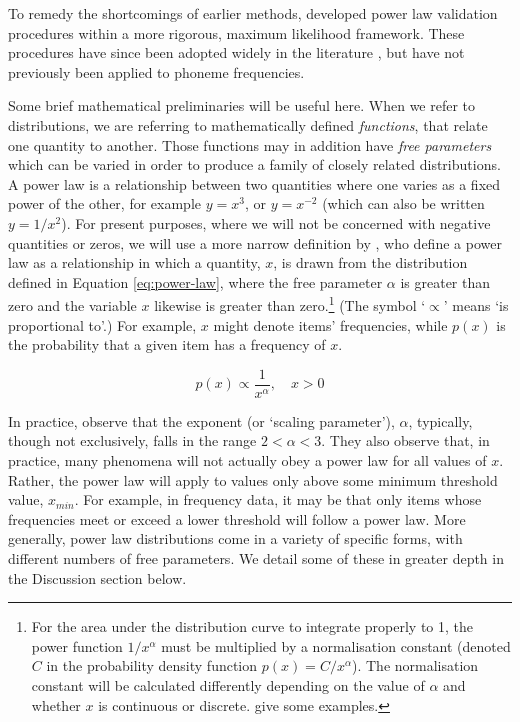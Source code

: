 To remedy the shortcomings of earlier methods, \textcite{clauset_power-law_2009} developed power law validation procedures within a more rigorous, maximum likelihood framework. These procedures have since been adopted widely in the literature \autocites[for example,][]{touboul_can_2010}{cho_friendship_2011}{brzezinski_power_2014}[and][]{lee_change_2018}, but have not previously been applied to phoneme frequencies.

Some brief mathematical preliminaries will be useful here. When we refer to distributions, we are referring to mathematically defined \emph{functions}, that relate one quantity to another. Those functions may in addition have \emph{free parameters} which can be varied in order to produce a family of closely related distributions. A power law is a relationship between two quantities where one varies as a fixed power of the other, for example \(y = x^3\), or \(y = x^{-2}\) (which can also be written \(y = 1/x^2\)). For present purposes, where we will not be concerned with negative quantities or zeros, we will use a more narrow definition by \textcite[p.~662]{clauset_power-law_2009}, who define a power law as a relationship in which a quantity, \(x\), is drawn from the distribution defined in Equation \eqref{eq:power-law}, where the free parameter \(\alpha\) is greater than zero and the variable \(x\) likewise is greater than zero.\footnote{For the area under the distribution curve to integrate properly to 1, the power function \(1/x^{\alpha}\) must be multiplied by a normalisation constant (denoted \(C\) in the probability density function \(p(x) = C/x^{\alpha}\)). The normalisation constant will be calculated differently depending on the value of \(\alpha\) and whether \(x\) is continuous or discrete. \textcite[p.~664]{clauset_power-law_2009} give some examples.} (The symbol `\(\propto\)' means `is proportional to'.) For example, \(x\) might denote items' frequencies, while \(p(x)\) is the probability that a given item has a frequency of \(x\).

\begin{equation}
p(x) \propto \frac{1}{x^{\alpha}},\quad x > 0
\label{eq:power-law}
\end{equation}

In practice, \textcite[p.~662]{clauset_power-law_2009} observe that the exponent (or `scaling parameter'), \(\alpha\), typically, though not exclusively, falls in the range \(2 < \alpha < 3\). They also observe that, in practice, many phenomena will not actually obey a power law for all values of \(x\). Rather, the power law will apply to values only above some minimum threshold value, \(x_{min}\). For example, in frequency data, it may be that only items whose frequencies meet or exceed a lower threshold will follow a power law. More generally, power law distributions come in a variety of specific forms, with different numbers of free parameters. We detail some of these in greater depth in the Discussion section below.

